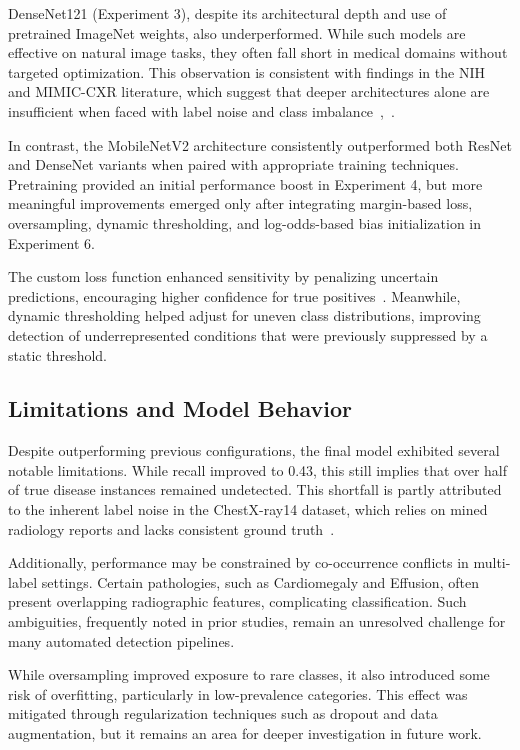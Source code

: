 \documentclass[12pt]{article}
\begin{document}
\begin{multicols}{2}
DenseNet121 (Experiment 3), despite its architectural depth and use of pretrained ImageNet weights, also underperformed. While such models are effective on natural image tasks, they often fall short in medical domains without targeted optimization. This observation is consistent with findings in the NIH and MIMIC-CXR literature, which suggest that deeper architectures alone are insufficient when faced with label noise and class imbalance~\cite{wang2017chestx},~\cite{johnson2019mimic}.

In contrast, the MobileNetV2 architecture consistently outperformed both ResNet and DenseNet variants when paired with appropriate training techniques. Pretraining provided an initial performance boost in Experiment 4, but more meaningful improvements emerged only after integrating margin-based loss, oversampling, dynamic thresholding, and log-odds-based bias initialization in Experiment 6.

The custom loss function enhanced sensitivity by penalizing uncertain predictions, encouraging higher confidence for true positives~\cite{13}. Meanwhile, dynamic thresholding helped adjust for uneven class distributions, improving detection of underrepresented conditions that were previously suppressed by a static threshold.

\subsection{Limitations and Model Behavior}
Despite outperforming previous configurations, the final model exhibited several notable limitations. While recall improved to 0.43, this still implies that over half of true disease instances remained undetected. This shortfall is partly attributed to the inherent label noise in the ChestX-ray14 dataset, which relies on mined radiology reports and lacks consistent ground truth~\cite{wang2017chestx}.

Additionally, performance may be constrained by co-occurrence conflicts in multi-label settings. Certain pathologies, such as Cardiomegaly and Effusion, often present overlapping radiographic features, complicating classification. Such ambiguities, frequently noted in prior studies, remain an unresolved challenge for many automated detection pipelines.

While oversampling improved exposure to rare classes, it also introduced some risk of overfitting, particularly in low-prevalence categories. This effect was mitigated through regularization techniques such as dropout and data augmentation, but it remains an area for deeper investigation in future work.


\end{multicols}
\end{document}
